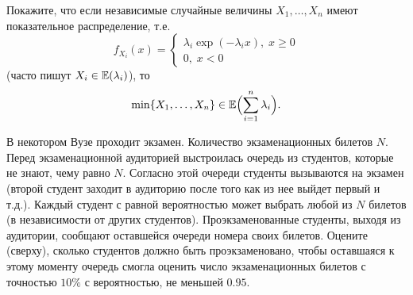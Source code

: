 \begin{comment}
\begin{problem}[рекорды]
Пусть $X_1 ,X_2 ,\ldots $ - независимые 
случайные величины с одной и той же плотностью распределения вероятностей 
$p(x)$. Будем говорить, что наблюдается рекордное значение в момент времени 
n$>$1, если $X_n >\max \left[ {X_1 ,...,X_{n-1} } \right]$. Докажите 
следующие утверждения.

\begin{enumerate}
\item[\textbf{А)}] Вероятность того, что рекорд зафиксирован в момент времени $n$, 
равна $1/n$.

\item[\textbf{Б)}] Математическое ожидание числа рекордов до момента времени $n$ 
равно 
\[
\sum\limits_{1<i\le n} {\frac{1}{i}} \sim \ln n.
\]

\item[\textbf{В)}] Пусть $Y_n $ --- случайная величина, принимающая значение $1$, если 
в момент времени $n$ зафиксирован рекорд, и значение $0$ -- в противном случае. 
Тогда случайные величины $Y_1 ,Y_2 ,\ldots$ независимы в совокупности.

\item[\textbf{Г)}] Дисперсия числа рекордов до момента времени $n$ равна
\[
\sum\limits_{1<i\le n} {\frac{i-1}{i^2}} \sim \ln n.
\]

\item[\textbf{Д)}] Если $T$ -- момент появления первого рекорда после момента времени $1$, то $ET=\infty $.
\end{enumerate}
\end{problem}

\end{comment}

\begin{problem}
Покажите, что если независимые случайные величины $X_1,\ldots, X_n$ имеют показательное распределение, т.е. 
$$
f_{X_i}(x)=\begin{cases}
\lambda_i\exp(-\lambda_i x), \; x\geqslant 0 \\
0,\; x<0
\end{cases}
$$
(часто пишут $X_i\in\mathrm{{\mathbb E}}(\lambda_i)$), то 
$$
\min\{ X_1,\ldots, X_n\}\in \mathrm{{\mathbb E}}\Bigl( \sum\limits_{i=1}^{n}\lambda_i\Bigr) . 
$$
\end{problem}

\begin{problem}
В некотором Вузе проходит экзамен. Количество экзаменационных билетов $N$. Перед экзаменационной аудиторией выстроилась очередь из 
студентов, которые не знают, чему равно $N$. Согласно этой очереди студенты вызываются на экзамен (второй студент заходит в аудиторию 
после того как из нее выйдет первый и т.д.). Каждый студент с равной вероятностью может выбрать любой из $N$ билетов (в независимости 
от других студентов). Проэкзаменованные студенты, выходя из аудитории, сообщают оставшейся очереди номера своих билетов. 
Оцените (сверху), сколько студентов должно быть проэкзаменовано, чтобы оставшаяся к этому моменту очередь смогла оценить число 
экзаменационных билетов с точностью $10\%$ с вероятностью, не меньшей $0.95$. 
\end{problem}

